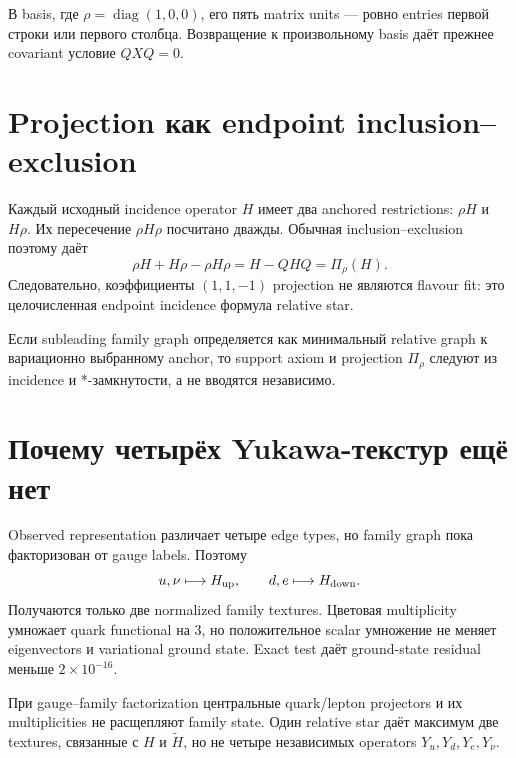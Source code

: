 В basis, где \(\rho=\operatorname{diag}(1,0,0)\), его пять matrix units ---
ровно entries первой строки или первого столбца. Возвращение к произвольному
basis даёт прежнее covariant условие \(QXQ=0\).

\section{Projection как endpoint inclusion--exclusion}

Каждый исходный incidence operator \(H\) имеет два anchored restrictions:
\(\rho H\) и \(H\rho\). Их пересечение \(\rho H\rho\) посчитано дважды.
Обычная inclusion--exclusion поэтому даёт
\begin{equation}
 \rho H+H\rho-\rho H\rho
 =H-QHQ
 =\Pi_\rho(H).
\end{equation}
Следовательно, коэффициенты \((1,1,-1)\) projection не являются flavour
fit: это целочисленная endpoint incidence формула relative star.

\begin{proposition}
Если subleading family graph определяется как минимальный relative graph к
вариационно выбранному anchor, то support axiom и projection \(\Pi_\rho\)
следуют из incidence и *-замкнутости, а не вводятся независимо.
\end{proposition}

\section{Почему четырёх Yukawa-текстур ещё нет}

Observed representation различает четыре edge types, но family graph пока
факторизован от gauge labels. Поэтому
\begin{equation}
 u,\nu\longmapsto H_{\rm up},
 \qquad
 d,e\longmapsto H_{\rm down}.
\end{equation}
Получаются только две normalized family textures. Цветовая multiplicity
умножает quark functional на \(3\), но положительное scalar умножение не
меняет eigenvectors и variational ground state. Exact test даёт ground-state
residual меньше \(2\times10^{-16}\).

\begin{theorem}
При gauge--family factorization центральные quark/lepton projectors и их
multiplicities не расщепляют family state. Один relative star даёт максимум
две textures, связанные с \(H\) и \(\widetilde H\), но не четыре независимых
operators \(Y_u,Y_d,Y_e,Y_\nu\).
\end{theorem}

